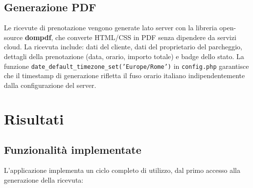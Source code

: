 \documentclass[12pt, a4paper]{article}
\begin{document}
\subsection{Generazione PDF}

Le ricevute di prenotazione vengono generate lato server con la libreria
open-source \textbf{dompdf}, che converte HTML/CSS in PDF senza dipendere
da servizi cloud. La ricevuta include: dati del cliente, dati del
proprietario del parcheggio, dettagli della prenotazione (data, orario,
importo totale) e badge dello stato. La funzione
\texttt{date\_default\_timezone\_set('Europe/Rome')} in \texttt{config.php}
garantisce che il timestamp di generazione rifletta il fuso orario italiano
indipendentemente dalla configurazione del server.

\section{Risultati}
\label{sec:risultati}

\subsection{Funzionalità implementate}

L'applicazione implementa un ciclo completo di utilizzo, dal primo accesso
alla generazione della ricevuta:
\end{document}
